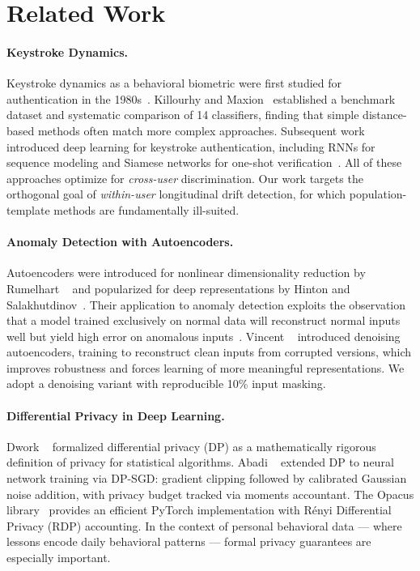 \section{Related Work}
\label{sec:related}

\paragraph{Keystroke Dynamics.}
Keystroke dynamics as a behavioral biometric were first studied for
authentication in the 1980s~\cite{monrose2000keystroke}.
Killourhy and Maxion~\cite{killourhy2009comparing} established a benchmark
dataset and systematic comparison of 14 classifiers, finding that simple
distance-based methods often match more complex approaches.
Subsequent work introduced deep learning for keystroke authentication,
including RNNs for sequence modeling and Siamese networks for one-shot
verification~\cite{lu2019deep}.
All of these approaches optimize for \emph{cross-user} discrimination.
Our work targets the orthogonal goal of \emph{within-user} longitudinal drift
detection, for which population-template methods are fundamentally ill-suited.

\paragraph{Anomaly Detection with Autoencoders.}
Autoencoders were introduced for nonlinear dimensionality reduction by
Rumelhart \etal~\cite{rumelhart1986learning} and popularized for deep
representations by Hinton and Salakhutdinov~\cite{hinton2006reducing}.
Their application to anomaly detection exploits the observation that a model
trained exclusively on normal data will reconstruct normal inputs well but
yield high error on anomalous inputs~\cite{an2015variational}.
Vincent \etal~\cite{vincent2010stacked} introduced denoising autoencoders,
training to reconstruct clean inputs from corrupted versions, which improves
robustness and forces learning of more meaningful representations.
We adopt a denoising variant with reproducible 10\% input masking.

\paragraph{Differential Privacy in Deep Learning.}
Dwork \etal~\cite{dwork2006calibrating} formalized differential privacy (DP)
as a mathematically rigorous definition of privacy for statistical algorithms.
Abadi \etal~\cite{abadi2016deep} extended DP to neural network training via
DP-SGD: gradient clipping followed by calibrated Gaussian noise addition,
with privacy budget tracked via moments accountant.
The Opacus library~\cite{yousefpour2021opacus} provides an efficient
PyTorch implementation with R\'{e}nyi Differential Privacy (RDP) accounting.
In the context of personal behavioral data — where lessons encode daily
behavioral patterns — formal privacy guarantees are especially important.

